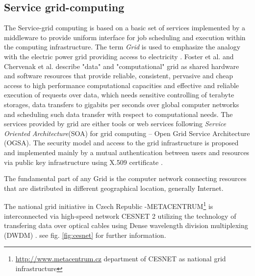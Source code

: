 \subsection{Service grid-computing}
\label{sec:servicegrid}

The Service-grid computing is based on a basic set of services implemented by a middleware to provide uniform interface for job scheduling and execution within the computing infrastructure. The term \emph{Grid} is used to emphasize the analogy with the electric power grid providing access to electricity \cite{foster2004}. Foster et al.\cite{foster2001,foster2004} and Chervenak et al. \cite{Chervenak2000} describe "data" and "computational" grid as shared hardware and software resources that provide reliable, consistent, pervasive and cheap access to high performance computational capacities and  effective and reliable execution of requests over data, which needs sensitive controlling of terabyte storages, data transfers to gigabits per seconds over global computer networks and scheduling such data transfer with respect to computational needs. The services provided by grid are either tools or web services following  \emph{Service Oriented Architecture}(SOA) for grid computing -- Open Grid Service Architecture (OGSA)\cite{Foster2003}. The security model and access to the grid infrastructure is proposed and implemented mainly by a mutual authentication between users and resources via public key infrastructure using X.509 certificate \cite{Foster1998}.

The fundamental part of any Grid is the computer network connecting resources that are distributed in different geographical location, generally Internet. 

The national grid initiative in Czech Republic 
-METACENTRUM\footnote{\url{http://www.metacentrum.cz} department of CESNET as national grid infrastructure} is interconnected via high-speed network CESNET 2 utilizing the technology of transfering data over optical cables using Dense wavelength division multiplexing (DWDM) \cite{novak2007deployment}. see fig. \ref{fig:cesnet} for further information.

